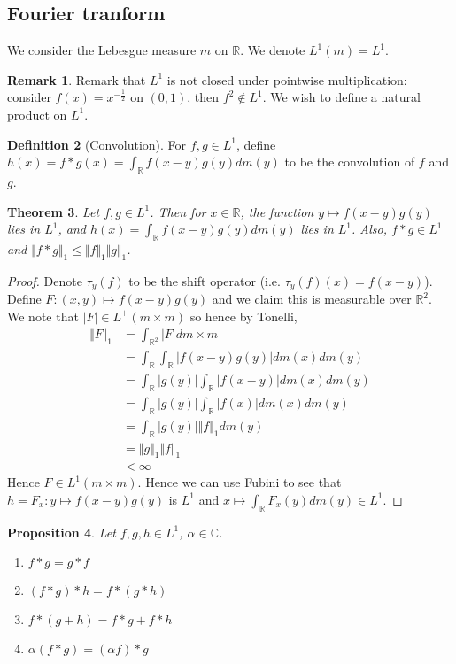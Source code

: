 \documentclass[11pt]{amsart}
\newtheorem{theorem}{Theorem}[section]
\newtheorem{proposition}[theorem]{Proposition}
\theoremstyle{definition}
\newtheorem{definition}[theorem]{Definition}
\newtheorem{remark}[theorem]{Remark}
\numberwithin{equation}{section}
\begin{document}
\subsection{Fourier tranform}
We consider the Lebesgue measure $m$ on $\mathbb R$. We denote $L^1(m)=L^1$.
\begin{remark}
    Remark that $L^1$ is not closed under pointwise multiplication: consider $f(x)=x^{-\frac{1}{2}}$ on $(0,1)$, then $f^2\not\in L^1$. We wish to define a natural product on $L^1$.
\end{remark}
\begin{definition}[Convolution]
    For $f,g\in L^1$, define $h(x)=f*g(x)=\int_\mathbb Rf(x-y)g(y)dm(y)$ to be the convolution of $f$ and $g$.
\end{definition}
\begin{theorem}\label{convolutiongood}
    Let $f,g\in L^1$. Then for $x\in\mathbb R$, the function $y\mapsto f(x-y)g(y)$ lies in $L^1$, and $h(x)=\int_\mathbb R f(x-y)g(y)dm(y)$ lies in $L^1$. Also, $f*g\in L^1$ and $\Vert f*g\Vert_1\le \Vert f\Vert_1\Vert g\Vert_1$.
\end{theorem}
\begin{proof}
    Denote $\tau_y(f)$ to be the shift operator (i.e. $\tau_y(f)(x)=f(x-y)$). Define $F:(x,y)\mapsto f(x-y)g(y)$ and we claim this is measurable over $\mathbb R^2$. We note that $|F|\in L^+(m\times m)$ so hence by Tonelli,
    \begin{align*}
        \Vert F\Vert_1&=\int_{\mathbb R^2}|F|dm\times m\\
        &=\int_\mathbb R\int_{\mathbb R}|f(x-y)g(y)|dm(x)dm(y)\\
        &=\int_\mathbb R|g(y)|\int_\mathbb R |f(x-y)|dm(x)dm(y)\\
        &=\int_{\mathbb R}|g(y)|\int_{\mathbb R}|f(x)|dm(x)dm(y)\\
        &=\int_\mathbb R|g(y)|\Vert f\Vert_1dm(y)\\
        &=\Vert g\Vert_1\Vert f\Vert_1\\
        &<\infty
    \end{align*}
    Hence $F\in L^1(m\times m)$. Hence we can use Fubini to see that $h=F_x:y\mapsto f(x-y)g(y)$ is $L^1$ and $x\mapsto \int_\mathbb RF_x(y)dm(y)\in L^1$.
\end{proof}
\begin{proposition}
    Let $f,g,h\in L^1$, $\alpha\in\mathbb C$.
    \begin{enumerate}
        \item [(i)] $f*g=g*f$
        \item [(ii)] $(f*g)*h=f*(g*h)$
        \item [(iii)] $f*(g+h)=f*g+f*h$
        \item [(iv)] $\alpha(f*g)=(\alpha f)*g$
    \end{enumerate}
\end{proposition}
\end{document}
